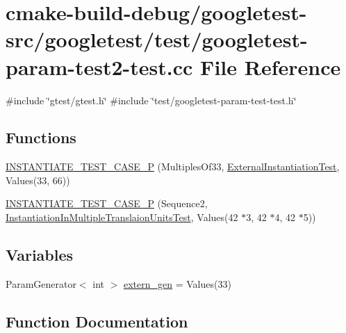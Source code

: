 \hypertarget{googletest-param-test2-test_8cc}{}\section{cmake-\/build-\/debug/googletest-\/src/googletest/test/googletest-\/param-\/test2-\/test.cc File Reference}
\label{googletest-param-test2-test_8cc}
{\ttfamily \#include \char`\"{}gtest/gtest.\+h\char`\"{}}\newline
{\ttfamily \#include \char`\"{}test/googletest-\/param-\/test-\/test.\+h\char`\"{}}\newline
\subsection*{Functions}
\begin{DoxyCompactItemize}
\item 
\mbox{\hyperlink{googletest-param-test2-test_8cc_a433ad86af147648bc394f0f37016f336}{I\+N\+S\+T\+A\+N\+T\+I\+A\+T\+E\+\_\+\+T\+E\+S\+T\+\_\+\+C\+A\+S\+E\+\_\+P}} (Multiples\+Of33, \mbox{\hyperlink{classExternalInstantiationTest}{External\+Instantiation\+Test}}, Values(33, 66))
\item 
\mbox{\hyperlink{googletest-param-test2-test_8cc_a06b097d2f2746a785ab07df0cc2e80a2}{I\+N\+S\+T\+A\+N\+T\+I\+A\+T\+E\+\_\+\+T\+E\+S\+T\+\_\+\+C\+A\+S\+E\+\_\+P}} (Sequence2, \mbox{\hyperlink{classInstantiationInMultipleTranslaionUnitsTest}{Instantiation\+In\+Multiple\+Translaion\+Units\+Test}}, Values(42 $\ast$3, 42 $\ast$4, 42 $\ast$5))
\end{DoxyCompactItemize}
\subsection*{Variables}
\begin{DoxyCompactItemize}
\item 
Param\+Generator$<$ int $>$ \mbox{\hyperlink{googletest-param-test2-test_8cc_a0f691f1461778d71f30b1fb1dea1cb50}{extern\+\_\+gen}} = Values(33)
\end{DoxyCompactItemize}


\subsection{Function Documentation}
\mbox{\label{googletest-param-test2-test_8cc_a433ad86af147648bc394f0f37016f336}} 
